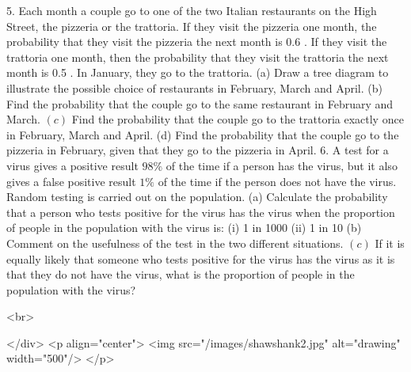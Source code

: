 5. Each month a couple go to one of the two Italian restaurants on the High Street, the pizzeria or the trattoria. If they visit the pizzeria one month, the probability that they visit the pizzeria the next month is 0.6 . If they visit the trattoria one month, then the probability that they visit the trattoria the next month is 0.5 . In January, they go to the trattoria.
(a) Draw a tree diagram to illustrate the possible choice of restaurants in February, March and April.
(b) Find the probability that the couple go to the same restaurant in February and March.
\((c)\) Find the probability that the couple go to the trattoria exactly once in February, March and April.
(d) Find the probability that the couple go to the pizzeria in February, given that they go to the pizzeria in April.
6. A test for a virus gives a positive result $98 \%$ of the time if a person has the virus, but it also gives a false positive result $1 \%$ of the time if the person does not have the virus. Random testing is carried out on the population.
(a) Calculate the probability that a person who tests positive for the virus has the virus when the proportion of people in the population with the virus is:
(i) 1 in 1000
(ii) 1 in 10
(b) Comment on the usefulness of the test in the two different situations.
\((c)\) If it is equally likely that someone who tests positive for the virus has the virus as it is that they do not have the virus, what is the proportion of people in the population with the virus?

<br>

</div>
<p align="center">
<img src="/images/shawshank2.jpg" alt="drawing" width="500"/>
</p>
